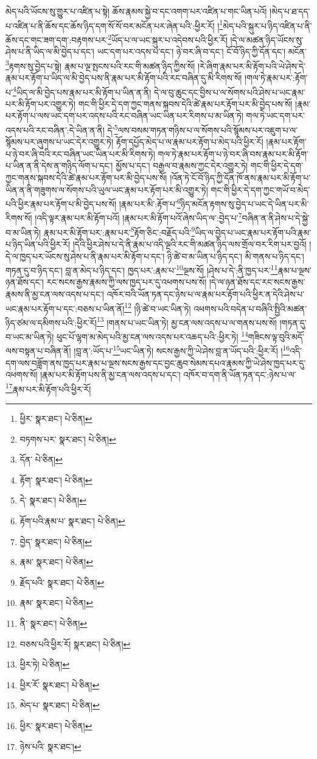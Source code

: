 མེད་པའི་ཡོངས་སུ་གྱུར་པ་འཛིན་པ་སྟེ། ཆོས་རྣམས་སྐྱེ་བ་དང་འགག་པར་འཛིན་པ་གང་ཡིན་པའོ། །མེད་པ་ཐ་དད་པ་འཛིན་པ་ནི་ཆོས་དང་ཆོས་ཉིད་དག་སོ་སོ་བར་མངོན་པར་ཞེན་པའི་:ཕྱིར་རོ། །\footnote{ཕྱིར་  སྣར་ཐང་།  པེ་ཅིན། }མེད་པའི་སྐུར་པ་ཉིད་འཛིན་པ་ནི་ཆོས་དང་གང་ཟག་དག་:བརྟགས་པར་\footnote{བཏགས་པར་  སྣར་ཐང་།  པེ་ཅིན། }ཡོད་པ་ལ་ཡང་སྐུར་པ་འདེབས་པའི་ཕྱིར་རོ། །དེ་ལ་མཚན་ཉིད་ཡོངས་སུ་ཤེས་པ་ནི་ཡིད་ལ་མི་བྱེད་པ་དང་། ཡང་དག་པར་འདས་པ་དང་། ཉེ་བར་ཞི་བ་དང་། ངོ་བོ་ཉིད་ཀྱི་དོན་དང་། མངོན་\footnote{དོན་  པེ་ཅིན། }རྟགས་སུ་བྱེད་པ་སྟེ། རྣམ་པ་ལྔ་སྤངས་པའི་རང་གི་མཚན་ཉིད་ཀྱིས་སོ། །རེ་ཞིག་རྣམ་པར་མི་རྟོག་པའི་ཡེ་ཤེས་དེ་རྣམ་པར་རྟོག་པ་ཡིད་ལ་མི་བྱེད་པས་ནི་རྣམ་པར་མི་རྟོག་པའི་རང་བཞིན་དུ་མི་རིགས་སོ། །གལ་ཏེ་རྣམ་པར་:རྟོག་པ་\footnote{རྟོག་  སྣར་ཐང་།  པེ་ཅིན། }ཡིད་ལ་མི་བྱེད་པས་རྣམ་པར་མི་རྟོག་པ་ཡིན་ན་ནི། དེ་ལ་བུ་ཆུང་དང་བྱིས་པ་ལ་སོགས་པའི་ཤེས་པ་ཡང་རྣམ་པར་མི་རྟོག་པར་འགྱུར་ཏེ། གང་གི་ཕྱིར་དེ་དག་ཀྱང་གནས་སྐབས་དེའི་ཚེ་རྣམ་པར་རྟོག་པར་མི་བྱེད་པས་སོ། །རྣམ་པར་རྟོག་པ་ལས་ཡང་དག་པར་འདས་པའི་རང་བཞིན་ཡང་ཡིན་པར་རིགས་པ་མ་ཡིན་ཏེ། གལ་ཏེ་ཡང་དག་པར་འདས་པའི་རང་བཞིན་:དེ་ཡིན་ན་ནི། དེ་\footnote{དེ་  སྣར་ཐང་།  པེ་ཅིན། }ལས་བསམ་གཏན་གཉིས་པ་ལ་སོགས་པའི་སྙོམས་པར་འཇུག་པ་ལ་སྙོམས་པར་ཞུགས་པ་ཡང་དེར་འགྱུར་ཏེ། རྟོག་དཔྱོད་མེད་པ་ལ་རྣམ་པར་རྟོག་པ་མེད་པའི་ཕྱིར་རོ། །རྣམ་པར་རྟོག་པ་ཉེ་བར་ཞི་བའི་རང་བཞིན་ཡང་ཡིན་པར་མི་རིགས་ཏེ། གལ་ཏེ་རྣམ་པར་རྟོག་པ་ཉེ་བར་ཞི་བས་རྣམ་པར་མི་རྟོག་པ་ཡིན་ན་ནི་དེས་ན་གཉིད་ལོག་པ་དང་། མྱོས་པ་དང་། བརྒྱལ་བ་རྣམས་ཀྱང་དེར་འགྱུར་ཏེ། གང་གི་ཕྱིར་དེ་དག་ཀྱང་གནས་སྐབས་དེའི་ཚེ་རྣམ་པར་རྟོག་པར་མི་བྱེད་པས་སོ། །འོན་ཏེ་ངོ་བོ་ཉིད་ཀྱི་དོན་ཁོ་ནས་རྣམ་པར་མི་རྟོག་པ་ཡིན་ན་ནི་གཟུགས་ལ་སོགས་པའི་ཡུལ་ཡང་རྣམ་པར་རྟོག་པར་མི་འགྱུར་ཏེ། གང་གི་ཕྱིར་དེ་དག་ཀྱང་གཡོ་བ་མེད་པའི་ཕྱིར་རྣམ་པར་རྟོག་པ་མི་བྱེད་པས་སོ། །རྣམ་པར་མི་:རྟོག་པ་\footnote{རྟོག་པའི་རྣམ་པ་  སྣར་ཐང་།  པེ་ཅིན། }ཉིད་མངོན་རྟགས་སུ་བྱེད་པ་ཡང་དེ་ཡིན་པར་མི་རིགས་སོ། །འདི་ལྟར་རྣམ་པར་མི་རྟོག་པའོ། །རྣམ་པར་མི་རྟོག་པའོ་ཞེས་ཡིད་ལ་:བྱེད་པ་\footnote{བྱེད་  སྣར་ཐང་།  པེ་ཅིན། }བཞིན་ན་ནི་ཤེས་པ་དེ་སྐྱེ་བ་མ་ཡིན་ཏེ། རྣམ་པར་མི་རྟོག་པར་:རྣམ་པར་\footnote{རྣམ་  སྣར་ཐང་།  པེ་ཅིན། }རྟོག་ཅིང་:བརྗོད་པའི་\footnote{རྗོད་པའི་  སྣར་ཐང་།  པེ་ཅིན། }ཡིད་ལ་བྱེད་པ་ཡང་རྣམ་པར་རྟོག་པའི་རྣམ་པ་ཉིད་ཡིན་པའི་ཕྱིར་རོ། །དེའི་ཕྱིར་ཤེས་པ་དེ་ནི་རྣམ་པ་འདི་ལྔའི་རང་གི་མཚན་ཉིད་ལས་གྲོལ་བར་རིག་པར་བྱའོ། །དེ་ལ་ཁྱད་པར་ཡོངས་སུ་ཤེས་པ་ནི་རྣམ་པར་མི་རྟོག་པ་དང་། ཉི་ཚེ་བ་མ་ཡིན་པ་ཉིད་དང་། མི་གནས་པ་ཉིད་དང་། གཏན་དུ་བ་ཉིད་དང་། བླ་ན་མེད་པ་ཉིད་དང་། ཁྱད་པར་:རྣམ་པ་\footnote{རྣམ་  སྣར་ཐང་།  པེ་ཅིན། }ལྔས་སོ། །ཤེས་པ་དེ་:ནི་ཁྱད་པར་\footnote{ནི་  སྣར་ཐང་།  པེ་ཅིན། }རྣམ་པ་ལྔས་ཉན་ཐོས་དང་། རང་སངས་རྒྱས་རྣམས་ཀྱི་ལས་ཁྱད་པར་དུ་འཕགས་པས་སོ། །དེ་ལ་ཉན་ཐོས་དང་རང་སངས་རྒྱས་རྣམས་ནི་མྱ་ངན་ལས་འདས་པ་དང་། འཁོར་བའི་ཡོན་ཏན་དང་ཉེས་པ་ལ་རྣམ་པར་རྟོག་པའི་ཕྱིར་ན་དེའི་ཤེས་པ་ཡང་རྣམ་པར་རྟོག་པ་དང་:བཅས་པ་ཡིན་ནོ།\footnote{བཅས་པའི་ཕྱིར་རོ།  སྣར་ཐང་།  པེ་ཅིན། } །ཉི་ཚེ་བ་ཡང་ཡིན་ཏེ། འཕགས་པའི་བདེན་པ་བཞིའི་སྤྱིའི་མཚན་ཉིད་ཙམ་ལ་དམིགས་པའི་:ཕྱིར་རོ།\footnote{ཕྱིར་ཏེ།  པེ་ཅིན། } །གནས་པ་ཡང་ཡིན་ཏེ། མྱ་ངན་ལས་འདས་པ་ལ་གནས་པས་སོ། །གཏན་དུ་བ་ཡང་མ་ཡིན་ཏེ། ཕུང་པོ་ལྷག་མ་མེད་པའི་མྱ་ངན་ལས་འདས་པར་འཆད་པའི་:ཕྱིར་ཏེ། \footnote{ཕྱིར་རོ་  སྣར་ཐང་།  པེ་ཅིན། }གཟིངས་ལྟ་བུའི་མདོ་ལས་བསྟན་པ་བཞིན་ནོ། །བླ་ན་:ཡོད་པ་\footnote{མེད་པ་  སྣར་ཐང་།  པེ་ཅིན། }ཡང་ཡིན་ཏེ། སངས་རྒྱས་ཀྱི་ཡེ་ཤེས་བླ་ན་ཡོད་པའི་:ཕྱིར་རོ། །\footnote{ཕྱིར་  སྣར་ཐང་།  པེ་ཅིན། }འདི་དག་ལས་བཟློག་ནས་ཁྱད་པར་རྣམ་པ་ལྔས་སངས་རྒྱས་དང་བྱང་ཆུབ་སེམས་དཔའ་རྣམས་ཀྱི་ཡེ་ཤེས་ཁྱད་པར་དུ་འཕགས་སོ། །རྣམ་པར་མི་རྟོག་པས་ནི་མྱ་ངན་ལས་འདས་པ་དང་། འཁོར་བ་དག་ནི་ཡོན་ཏན་དང་:ཉེས་པ་ལ་\footnote{ཉེས་པའི་  སྣར་ཐང་། }རྣམ་པར་མི་རྟོག་པའི་ཕྱིར་རོ། 